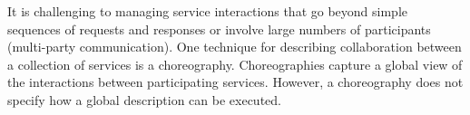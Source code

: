 \documentclass[10pt]{llncs}
\begin{document}
It is challenging to managing service interactions that go beyond simple sequences of requests and responses or involve large numbers of participants (multi-party communication).
One technique for describing collaboration between a collection of services is a choreography.
Choreographies capture a global view of the interactions between participating services. %
However, a choreography does not specify how a global description can be executed.

\end{document}
